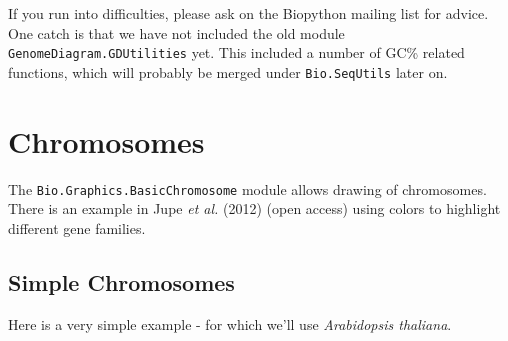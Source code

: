 \documentclass{report}
\begin{document}
If you run into difficulties, please ask on the Biopython mailing list for
advice. One catch is that we have not included the old module
\verb|GenomeDiagram.GDUtilities| yet.  This included a number of
GC\% related functions, which will probably be merged under
\verb|Bio.SeqUtils| later on.

\section{Chromosomes}

The \verb|Bio.Graphics.BasicChromosome| module allows drawing of chromosomes.
There is an example in Jupe \textit{et al.} (2012) \cite{jupe2012}
(open access) using colors to highlight different gene families.

\subsection{Simple Chromosomes}
Here is a very simple example - for which we'll use \textit{Arabidopsis thaliana}.
\end{document}
